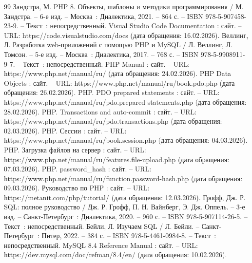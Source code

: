 
\begin{thebibliography}{99}
	 Зандстра, М. PHP 8. Объекты, шаблоны и методики программирования / М. Зандстра. -- 6-е изд. -- Москва~: Диалектика, 2021. -- 864 с. -- ISBN 978-5-907458-23-9. -- Текст~: непосредственный.
	 Visual Studio Code Documentation : сайт. -- URL: https://code.visualstudio.com/docs (дата обращения: 16.02.2026).
	 Веллинг, Л. Разработка web-приложений с помощью PHP и MySQL / Л. Веллинг, Л. Томсон. -- 5-е изд. -- Москва~: Диалектика, 2017. -- 768 с. -- ISBN 978-5-9908911-9-7. -- Текст~: непосредственный.
	 PHP Manual : сайт. -- URL: https://www.php.net/manual/ru/ (дата обращения: 24.02.2026).
	 PHP Data Objects : сайт. -- URL: https://www.php.net/manual/ru/book.pdo.php (дата обращения: 26.02.2026).
	 PHP. PDO prepared statements : сайт. -- URL: https://www.php.net/manual/ru/pdo.prepared-statements.php (дата обращения: 28.02.2026).
	 PHP. Transactions and auto-commit : сайт. -- URL: https://www.php.net/manual/ru/pdo.transactions.php (дата обращения: 02.03.2026).
	 PHP. Сессии : сайт. -- URL: https://www.php.net/manual/ru/\allowbreak book.session.php (дата обращения: 04.03.2026).
	 PHP. Загрузка файлов на сервер : сайт. -- URL: https://www.php.net/manual/ru/features.file-upload.php (дата обращения: 07.03.2026).
	 PHP. password\_hash : сайт. -- URL: https://www.php.net/manual/ru/function.password-hash.php (дата обращения: 09.03.2026).
	 Руководство по PHP : сайт. -- URL: https://metanit.com/php/tutorial/ (дата обращения: 12.03.2026).
	 Грофф, Дж. Р. SQL: полное руководство / Дж. Р. Грофф, П. Н. Вайнберг, Э. Дж. Оппель. -- 3-е изд. -- Санкт-Петербург~: Диалектика, 2020. -- 960 с. -- ISBN 978-5-907114-26-5. -- Текст~: непосредственный.
	 Бейли, Л. Изучаем SQL / Л. Бейли. -- Санкт-Петербург~: Питер, 2022. -- 384 с. -- ISBN 978-5-4461-0984-8. -- Текст~: непосредственный.
	 MySQL 8.4 Reference Manual : сайт. -- URL: https://dev.mysql.com/doc/refman/8.4/en/ (дата обращения: 10.02.2026).
	

\end{thebibliography}
